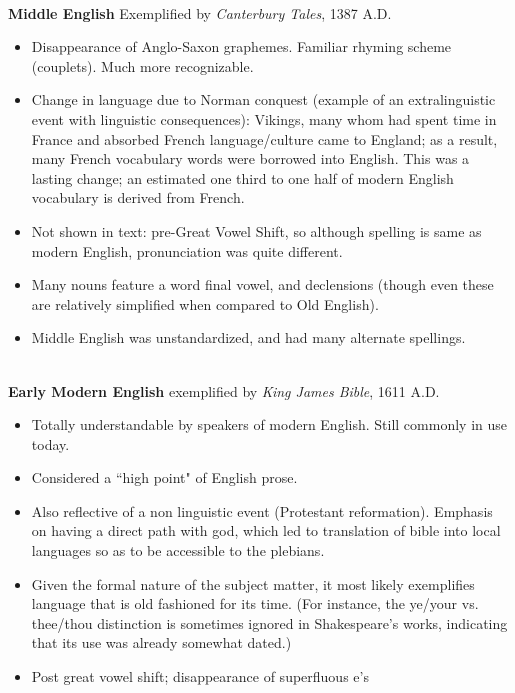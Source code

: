 \documentclass{exam}
\begin{document}
\noindent \textbf{\\Middle English} Exemplified by \textit{Canterbury Tales}, 1387 A.D. 
\begin{itemize}

\item Disappearance of Anglo-Saxon graphemes. Familiar rhyming scheme (couplets). Much more recognizable. 
\item Change in language due to Norman conquest (example of an extralinguistic event with linguistic consequences): Vikings, many whom had spent time in France and absorbed French language/culture came to England; as a result, many French vocabulary words were borrowed into English. This was a lasting change; an estimated one third to one half of modern English vocabulary is derived from French. 
\item Not shown in text: pre-Great Vowel Shift, so although spelling is same as modern English, pronunciation was quite different. 
\item Many nouns feature a word final vowel, and declensions (though even these are relatively simplified when compared to Old English). 
\item Middle English was unstandardized, and had many alternate spellings. 
\end{itemize}

\noindent \textbf{\\Early Modern English} exemplified by \textit{King James Bible}, 1611 A.D. 
\begin{itemize}
\item Totally understandable by speakers of modern English. Still commonly in use today. 
\item Considered a ``high point" of English prose. 
\item Also reflective of a non linguistic event (Protestant reformation). Emphasis on having a direct path with god, which led to translation of bible into local languages so as to be accessible to the plebians. 
    
    
\item Given the formal nature of the subject matter, it 
 most likely exemplifies language that is old fashioned for its time. (For instance, the ye/your vs. thee/thou distinction is sometimes ignored in Shakespeare's works, indicating that its use was already somewhat dated.)
\item Post great vowel shift; disappearance of superfluous e's
\end{itemize}
\end{document}
